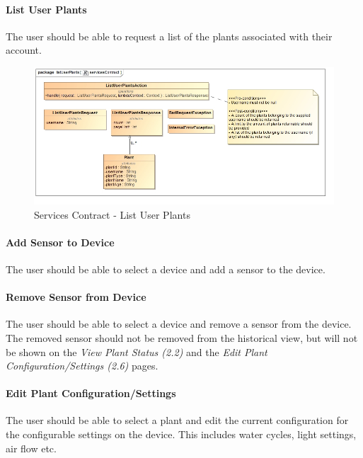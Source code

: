 \documentclass{article}
\let\cleardoublepage\clearpage
\begin{document}
			\paragraph{List User Plants}
			The user should be able to request a list of the plants associated with their account.
			\begin{figure}[H]
				\includegraphics[width=\linewidth]{../images/ServicesContracts/listUserPlants.jpg}
				\caption{Services Contract - List User Plants}
			\end{figure}
			
\cleardoublepage
			\paragraph{Add Sensor to Device}
			The user should be able to select a device and add a sensor to the device.
			\paragraph{Remove Sensor from Device}
			The user should be able to select a device and remove a sensor from the device. The removed sensor should not be removed from the historical view, but will not be shown on the \emph{View Plant Status (2.2)} and the \emph{Edit Plant Configuration/Settings (2.6)} pages.
			\paragraph{Edit Plant Configuration/Settings}
			The user should be able to select a plant and edit the current configuration for the configurable settings on the device. This includes water cycles, light settings, air flow etc.
\end{document}
